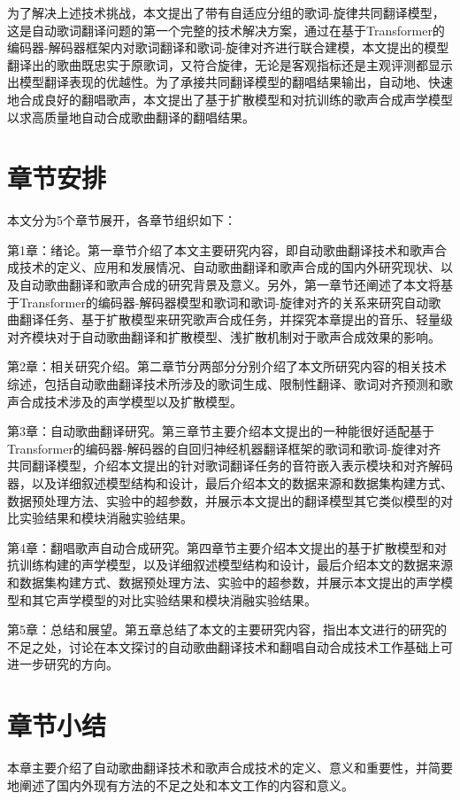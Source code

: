 为了解决上述技术挑战，本文提出了带有自适应分组的歌词-旋律共同翻译模型，这是自动歌词翻译问题的第一个完整的技术解决方案，通过在基于Transformer的编码器-解码器框架内对歌词翻译和歌词-旋律对齐进行联合建模，本文提出的模型翻译出的歌曲既忠实于原歌词，又符合旋律，无论是客观指标还是主观评测都显示出模型翻译表现的优越性。为了承接共同翻译模型的翻唱结果输出，自动地、快速地合成良好的翻唱歌声，本文提出了基于扩散模型和对抗训练的歌声合成声学模型以求高质量地自动合成歌曲翻译的翻唱结果。
\section{章节安排}
本文分为5个章节展开，各章节组织如下：

第1章：绪论。第一章节介绍了本文主要研究内容，即自动歌曲翻译技术和歌声合成技术的定义、应用和发展情况、自动歌曲翻译和歌声合成的国内外研究现状、以及自动歌曲翻译和歌声合成的研究背景及意义。另外，第一章节还阐述了本文将基于Transformer的编码器-解码器模型和歌词和歌词-旋律对齐的关系来研究自动歌曲翻译任务、基于扩散模型来研究歌声合成任务，并探究本章提出的音乐、轻量级对齐模块对于自动歌曲翻译和扩散模型、浅扩散机制对于歌声合成效果的影响。

第2章：相关研究介绍。第二章节分两部分分别介绍了本文所研究内容的相关技术综述，包括自动歌曲翻译技术所涉及的歌词生成、限制性翻译、歌词对齐预测和歌声合成技术涉及的声学模型以及扩散模型。

第3章：自动歌曲翻译研究。第三章节主要介绍本文提出的一种能很好适配基于Transformer的编码器-解码器的自回归神经机器翻译框架的歌词和歌词-旋律对齐共同翻译模型，介绍本文提出的针对歌词翻译任务的音符嵌入表示模块和对齐解码器，以及详细叙述模型结构和设计，最后介绍本文的数据来源和数据集构建方式、数据预处理方法、实验中的超参数，并展示本文提出的翻译模型其它类似模型的对比实验结果和模块消融实验结果。

第4章：翻唱歌声自动合成研究。第四章节主要介绍本文提出的基于扩散模型和对抗训练构建的声学模型，以及详细叙述模型结构和设计，最后介绍本文的数据来源和数据集构建方式、数据预处理方法、实验中的超参数，并展示本文提出的声学模型和其它声学模型的对比实验结果和模块消融实验结果。

第5章：总结和展望。第五章总结了本文的主要研究内容，指出本文进行的研究的不足之处，讨论在本文探讨的自动歌曲翻译技术和翻唱自动合成技术工作基础上可进一步研究的方向。
\section{章节小结}
本章主要介绍了自动歌曲翻译技术和歌声合成技术的定义、意义和重要性，并简要地阐述了国内外现有方法的不足之处和本文工作的内容和意义。
